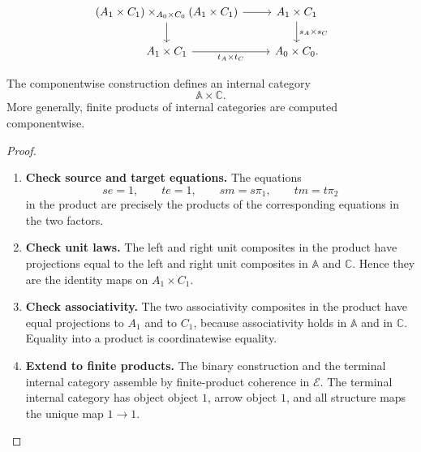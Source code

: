 \[
\begin{tikzcd}
(A_1\times C_1)\times_{A_0\times C_0}(A_1\times C_1)
    \arrow[r]
    \arrow[d]
&
A_1\times C_1
    \arrow[d,"s_A\times s_C"]
\\
A_1\times C_1
    \arrow[r,"t_A\times t_C"']
&
A_0\times C_0 .
\end{tikzcd}
\]

\begin{lemma}
\label{lem:cmett-products-internal-categories}
    The componentwise construction defines an internal category
    \[
        \mathbb A\times\mathbb C.
    \]
    More generally, finite products of internal categories are computed
    componentwise.
\end{lemma}

\begin{proof}
    \leavevmode
    \begin{enumerate}
        \item \textbf{Check source and target equations.}
        The equations
        \[
            se=1,
            \qquad
            te=1,
            \qquad
            sm=s\pi_1,
            \qquad
            tm=t\pi_2
        \]
        in the product are precisely the products of the corresponding
        equations in the two factors.

        \item \textbf{Check unit laws.}
        The left and right unit composites in the product have projections
        equal to the left and right unit composites in \(\mathbb A\) and
        \(\mathbb C\). Hence they are the identity maps on
        \(A_1\times C_1\).

        \item \textbf{Check associativity.}
        The two associativity composites in the product have equal
        projections to \(A_1\) and to \(C_1\), because associativity holds in
        \(\mathbb A\) and in \(\mathbb C\). Equality into a product is
        coordinatewise equality.

        \item \textbf{Extend to finite products.}
        The binary construction and the terminal internal category assemble
        by finite-product coherence in \(\mathcal E\). The terminal internal
        category has object object \(1\), arrow object \(1\), and all
        structure maps the unique map \(1\to 1\).
    \end{enumerate}
\end{proof}

